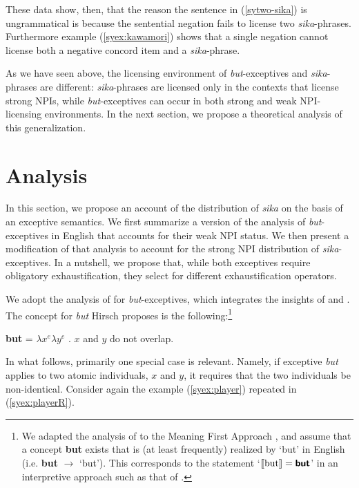 \documentclass[output=paper,colorlinks,citecolor=brown,
]{langscibook}
\let\l\lambda
\begin{document}
These data show, then, that the reason the sentence in (\ref{sytwo-sika}) is ungrammatical is because the sentential negation fails to license two \emph{sika}-phrases.  
Furthermore example (\ref{syex:kawamori}) shows that a single negation cannot license both a negative concord item and a \emph{sika}-phrase.

As we have seen above, the licensing environment of \emph{but}-exceptives and \emph{sika}-phrases are different: \emph{sika}-phrases are licensed only in the contexts that license strong NPIs, while \emph{but}-exceptives can occur in both strong and weak NPI-licensing environments.  In the next section, we propose a theoretical analysis of this generalization.


\def\textsb#1{\textsf{\textbf{#1}}}

\section{Analysis}\label{sysc:analysis}

In this section, we propose an account of the distribution of \emph{sika} on the basis of an exceptive semantics.
We first summarize a version of the analysis of \emph{but}-exceptives in English that accounts for their weak NPI status.
We then present a modification of that analysis to account for the strong NPI distribution of \emph{sika}-exceptives. In a nutshell, we propose that, while both exceptives require obligatory exhaustification, they select for different exhaustification operators.


We adopt the analysis of \cite{hirsch16b} for \emph{but}-exceptives, which integrates the insights of \cite{fintel93} and \cite{gajewski08b}.
The concept for \emph{but} Hirsch proposes is the following:\footnote{We adapted the analysis of \cite{hirsch16b} to the Meaning First Approach \citep{sauerland20b}, and assume that a concept \textsb{but} exists that is (at least frequently) realized by `but' in English (i.e. \textbf{but} $\longrightarrow$ `but').  This corresponds to the statement `$[\![\textrm{but}]\!] = \textsb{but}$' in an interpretive approach such as that of \cite{heim98}.} 

\ea \label{syex:but}
    \textsb{but} = $\l x^e  \l y^e$ . $x$ and $y$ do not overlap.\z

In what follows, primarily one special case is relevant. Namely, if exceptive \emph{but} applies to two atomic individuals, $x$ and $y$, it requires that the two individuals be non-identical.  
Consider again the example (\ref{syex:player}) repeated in (\ref{syex:playerR}).
\end{document}
